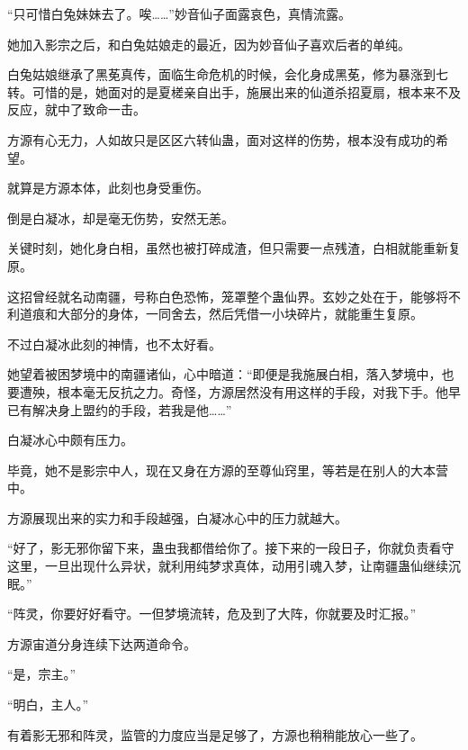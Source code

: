 \begin{this_body}
“只可惜白兔妹妹去了。唉……”妙音仙子面露哀色，真情流露。

她加入影宗之后，和白兔姑娘走的最近，因为妙音仙子喜欢后者的单纯。

白兔姑娘继承了黑莬真传，面临生命危机的时候，会化身成黑莬，修为暴涨到七转。可惜的是，她面对的是夏槎亲自出手，施展出来的仙道杀招夏扇，根本来不及反应，就中了致命一击。

方源有心无力，人如故只是区区六转仙蛊，面对这样的伤势，根本没有成功的希望。

就算是方源本体，此刻也身受重伤。

倒是白凝冰，却是毫无伤势，安然无恙。

关键时刻，她化身白相，虽然也被打碎成渣，但只需要一点残渣，白相就能重新复原。

这招曾经就名动南疆，号称白色恐怖，笼罩整个蛊仙界。玄妙之处在于，能够将不利道痕和大部分的身体，一同舍去，然后凭借一小块碎片，就能重生复原。

不过白凝冰此刻的神情，也不太好看。

她望着被困梦境中的南疆诸仙，心中暗道：“即便是我施展白相，落入梦境中，也要遭殃，根本毫无反抗之力。奇怪，方源居然没有用这样的手段，对我下手。他早已有解决身上盟约的手段，若我是他……”

白凝冰心中颇有压力。

毕竟，她不是影宗中人，现在又身在方源的至尊仙窍里，等若是在别人的大本营中。

方源展现出来的实力和手段越强，白凝冰心中的压力就越大。

“好了，影无邪你留下来，蛊虫我都借给你了。接下来的一段日子，你就负责看守这里，一旦出现什么异状，就利用纯梦求真体，动用引魂入梦，让南疆蛊仙继续沉眠。”

“阵灵，你要好好看守。一但梦境流转，危及到了大阵，你就要及时汇报。”

方源宙道分身连续下达两道命令。

“是，宗主。”

“明白，主人。”

有着影无邪和阵灵，监管的力度应当是足够了，方源也稍稍能放心一些了。

\end{this_body}

